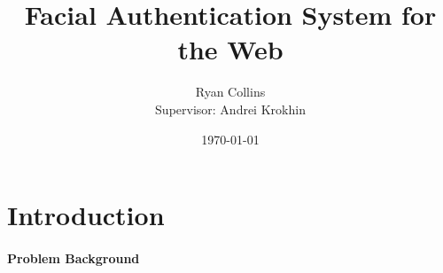 \documentclass[14pt]{article}
\title{Facial Authentication System for the Web}
\author{
        Ryan Collins\\
        Supervisor: Andrei Krokhin
}
\date{\today}
\begin{document}
\maketitle

\section{Introduction}
\paragraph{Problem Background}

\label{references}
\printbibliography
\end{document}
